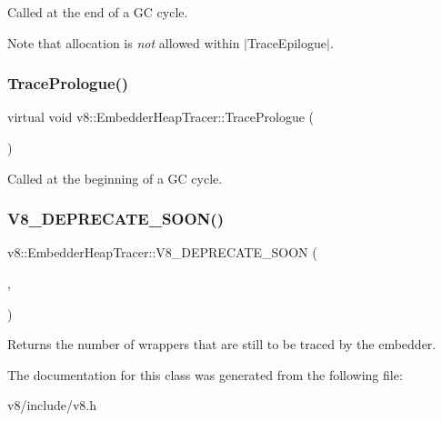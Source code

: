 Called at the end of a GC cycle.

Note that allocation is {\itshape not} allowed within $\vert$\+Trace\+Epilogue$\vert$. \mbox{\label{classv8_1_1EmbedderHeapTracer_af4f747aa1d77a0d2f341846b94f6b1ce}} 
\subsubsection{\texorpdfstring{Trace\+Prologue()}{TracePrologue()}}
{\footnotesize\ttfamily virtual void v8\+::\+Embedder\+Heap\+Tracer\+::\+Trace\+Prologue (\begin{DoxyParamCaption}{ }\end{DoxyParamCaption})\hspace{0.3cm}{\ttfamily [pure virtual]}}

Called at the beginning of a GC cycle. \mbox{\label{classv8_1_1EmbedderHeapTracer_a1ee993c45a50443baa7b3ad036f9e1fa}} 
\subsubsection{\texorpdfstring{V8\+\_\+\+D\+E\+P\+R\+E\+C\+A\+T\+E\+\_\+\+S\+O\+O\+N()}{V8\_DEPRECATE\_SOON()}}
{\footnotesize\ttfamily v8\+::\+Embedder\+Heap\+Tracer\+::\+V8\+\_\+\+D\+E\+P\+R\+E\+C\+A\+T\+E\+\_\+\+S\+O\+ON (\begin{DoxyParamCaption}\item[{\char`\"{}Use Is\+Tracing\+Done\char`\"{}}]{,  }\item[{virtual size\+\_\+t Number\+Of\+Wrappers\+To\+Trace() \{ return 0;\}}]{ }\end{DoxyParamCaption})}

Returns the number of wrappers that are still to be traced by the embedder. 

The documentation for this class was generated from the following file\+:\begin{DoxyCompactItemize}
\item 
v8/include/v8.\+h\end{DoxyCompactItemize}
